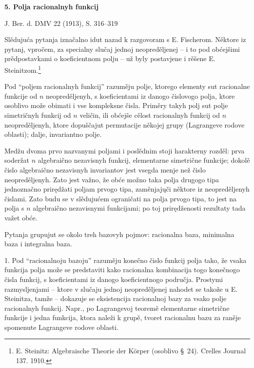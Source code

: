 \documentclass[11pt]{article}
\begin{document}
\begin{center}
{\Large\bfseries 5. Polja racionalnyh funkcij}\par
\vspace{1.2em}
J. Ber. d. DMV 22 (1913), S. 316--319
\end{center}

\vspace{2em}

Slědujuća pytanja iznačalno idut nazad k razgovoram s E. Fischerom. Něktore iz pytanj, vpročem, za specialny slučaj jednoj neopreděljenej -- i to pod obćejšimi prědpostavkami o koeficientnom polju -- už byly postavjene i rěšene E. Steinitzom.\footnote{E. Steinitz: Algebraische Theorie der Körper (osoblivo \S\ 24). Crelles Journal 137. 1910.}

Pod ``poljem racionalnyh funkcij'' razuměju polje, ktorego elementy sut racionalne funkcije od $n$ neopreděljenyh, s koeficientami iz danogo čislovogo polja, ktore osoblivo može obimati i vse kompleksne čisla. Priměry takyh polj sut polje simetričnyh funkcij od $n$ veličin, ili obćejše cělost racionalnyh funkcij od $n$ neopreděljenyh, ktore dopuščajut permutacije někojej grupy (Lagrangeve rodove oblasti); dalje, invariantno polje.

Medžu dvoma prvo nazvanymi poljami i poslědnim stoji harakterny rozděl: prva soderžat $n$ algebraično nezavisnyh funkcij, elementarne simetrične funkcije; dokolě čislo algebraično nezavisnyh invariantov jest vsegda menje než čislo neopreděljenyh. Zato jest važno, že obće možno taka polja drugogo tipa jednoznačno prirędžati poljam prvogo tipa, zaměnjajųči něktore iz neopreděljenyh čislami. Zato budu se v slědujućem ograničati na polja prvogo tipa, to jest na polja s $n$ algebraično nezavisnymi funkcijami; po toj prirędženosti rezultaty tada važet obće.

Pytanja grupujut se okolo treh bazovyh pojmov: racionalna baza, minimalna baza i integralna baza.

1. Pod ``racionalnoju bazoju'' razuměju konečno čislo funkcij polja tako, že vsaka funkcija polja može se predstaviti kako racionalna kombinacija togo konečnogo čisla funkcij, s koeficientami iz danogo koeficientnogo područja. Prostymi razmysljenjami -- ktore v slučaju jednoj neopreděljenej nahodet se takože u E. Steinitza, tamže -- dokazuje se eksistencija racionalnoj bazy za vsako polje racionalnyh funkcij. Napr., po Lagrangevoj teoremě elementarne simetrične funkcije i jedna funkcija, ktora naleži k grupě, tvoret racionalnu bazu za raněje spomenute Lagrangeve rodove oblasti.
\end{document}
